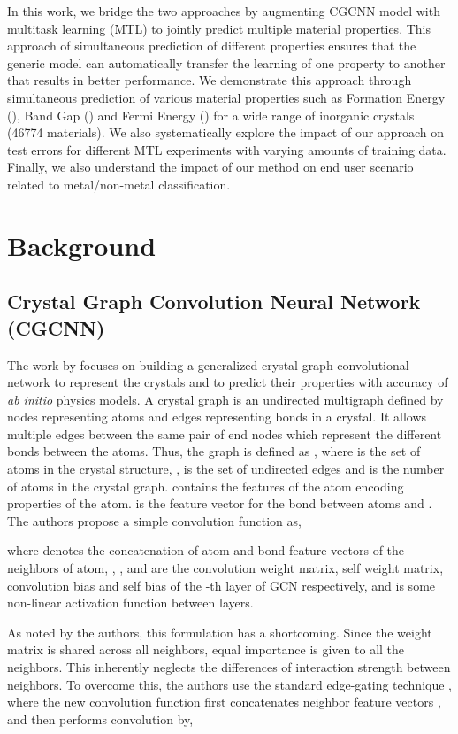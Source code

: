 \documentclass{article}
\newcommand{\baseline}[1]{CGCNN}
\newcommand{\propone}[1]{Formation Energy}
\newcommand{\proponesym}[1]{}
\newcommand{\proptwo}[1]{Band Gap}
\newcommand{\proptwosym}[1]{}
\newcommand{\propthree}[1]{Fermi Energy}
\newcommand{\propthreesym}[1]{}
\begin{document}
In this work, we bridge the two approaches by augmenting \baseline{} model with multitask learning (MTL) to jointly predict multiple material properties. This approach of simultaneous prediction of different properties ensures that the generic model can automatically transfer the learning of one property to another that results in better performance. We demonstrate this approach through simultaneous prediction of various  material properties such as \propone{} (\proponesym{}), \proptwo{} (\proptwosym{}) and \propthree{} (\propthreesym{}) for a wide range of inorganic crystals (46774 materials). We also systematically explore the impact of our approach on test errors for different MTL experiments with varying amounts of training data. Finally, we also understand the impact of our method on end user scenario related to metal/non-metal classification.
 \section{Background}
\label{sec:background}

\subsection{Crystal Graph Convolution Neural Network (\baseline{})}
\label{sec:cgcn}
The work by \citet{CGCNN} focuses on building a generalized crystal graph convolutional network to represent the crystals and to  predict their properties with accuracy of \textit{ab initio} physics models. A crystal graph  is an undirected multigraph defined by nodes representing atoms and edges representing bonds in a crystal. It allows multiple edges between the same pair of end nodes which represent the different bonds between the atoms. Thus, the graph is defined as , where  is the set of atoms in the crystal structure, , is the set of undirected edges and  is the number of atoms in the crystal graph.  contains the features of the  atom encoding properties of the atom.  is the feature vector for the  bond between atoms  and . The authors propose a simple convolution function as,



where  denotes the concatenation of atom and bond feature vectors of the neighbors of  atom, , ,  and  are the convolution weight matrix, self weight matrix, convolution bias and self bias of the -th layer of GCN respectively, and  is some non-linear activation function between layers.

As noted by the authors, this formulation has a shortcoming. Since the weight matrix is shared across all neighbors, equal importance is given to all the neighbors. This inherently neglects the differences of interaction strength between neighbors. To overcome this, the authors use the standard edge-gating technique \citep{MarcheggianiT17}, where the new convolution function first concatenates neighbor feature vectors , and then performs convolution by,
\end{document}
